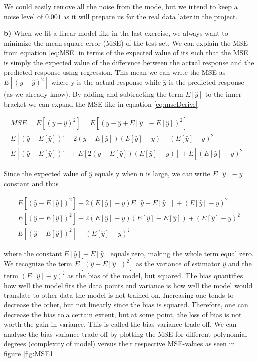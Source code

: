 \documentclass[12pt,a4paper]{article}
\begin{document}
\noindent We could easily remove all the noise from the mode, but we intend to keep a noise level of $0.001$ as it will prepare us for the real data later in the project.

\newpage

\noindent \textbf{b)} When we fit a linear model like in the last exercise, we always want to minimize the mean square error (MSE) of the test set. We can explain the MSE from equation \ref{eq:MSE} in terms of the expected value of its such that the MSE is simply the expected value of the difference between the actual response and the predicted response using regression. This mean we can write the MSE as $E[(y-\hat{y})^2]$ where y is the actual response while $\hat{y}$ is the predicted response (as we already know). By adding and subtracting the term $E[\hat{y}]$ to the inner bracket we can expand the MSE like in equation \ref{eq:mseDerive}

\begin{equation}\label{eq:mseDerive}
\begin{aligned}
MSE = E[(y-\hat{y})^2] = E[(y-\hat{y} + E[\hat{y}] - E[\hat{y}])^2]
\\
E[(\hat{y} - E[\hat{y}])^2 + 2(\hat{y} - E[\hat{y}])(E[\hat{y}]-y) + (E[\hat{y}]-y)^2]
\\
E[(\hat{y} - E[\hat{y}])^2] + E[2(\hat{y} - E[\hat{y}])(E[\hat{y}]-y)] + E[(E[\hat{y}]-y)^2]
\end{aligned}
\end{equation}

\noindent Since the expected value of $\hat{y}$ equals y when n is large, we can write $E[\hat{y}] - y =$ constant and thus

\begin{equation}\label{eq:mseDerive2}
\begin{aligned}
E[(\hat{y} - E[\hat{y}])^2] + 2(E[\hat{y}]-y)E[\hat{y}-E[\hat{y}]] + (E[\hat{y}]-y)^2
\\
E[(\hat{y} - E[\hat{y}])^2] + 2(E[\hat{y}]-y)(E[\hat{y}] - E[\hat{y}])+ (E[\hat{y}]-y)^2
\\
E[(\hat{y} - E[\hat{y}])^2] + (E[\hat{y}]-y)^2
\end{aligned}
\end{equation}

where the constant $E[\hat{y}] - E[\hat{y}]$ equals zero, making the whole term equal zero. 
\\
We recognize the term $E[(\hat{y} - E[\hat{y}])^2]$ as the variance of estimator $\hat{y}$ and the term $(E[\hat{y}]-y)^2$ as the bias of the model, but squared. The bias quantifies how well the model fits the data points and variance is how well the model would translate to other data the model is not trained on. Increasing one tends to decrease the other, but not linearly since the bias is squared. Therefore, one can decrease the bias to a certain extent, but at some point, the loss of bias is not worth the gain in variance. This is called the bias variance trade-off. We can analyse the bias variance trade-off by plotting the MSE for different polynomial degrees (complexity of model) versus their respective MSE-values as seen in figure \ref{fig:MSE1}
\end{document}
